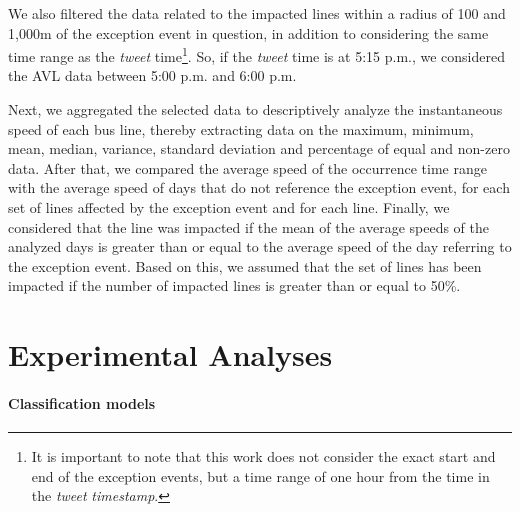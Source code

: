 \documentclass[runningheads]{llncs}
\begin{document}
We also filtered the data related to the impacted lines within a radius of 100 and 1,000m of the exception event in question, in addition to considering the same time range as the \textit{tweet} time\footnote{It is important to note that this work does not consider the exact start and end of the exception events, but a time range of one hour from the time in the \textit{tweet} \textit{timestamp}.}. So, if the \textit {tweet} time is at 5:15 p.m., we considered the AVL data between 5:00 p.m. and 6:00 p.m.

Next, we aggregated the selected data to descriptively analyze the instantaneous speed of each bus line, thereby extracting data on the maximum, minimum, mean, median, variance, standard deviation and percentage of equal and non-zero data. After that, we compared the average speed of the occurrence time range with the average speed of days that do not reference the exception event, for each set of lines affected by the exception event and for each line. Finally, we considered that the line was impacted if the mean of the average speeds of the analyzed days is greater than or equal to the average speed of the day referring to the exception event. Based on this, we assumed that the set of lines has been impacted if the number of impacted lines is greater than or equal to 50\%.


\section{Experimental Analyses}\label{sec:experimentalAnalyses}

\paragraph{\textbf{Classification models}}
\end{document}
